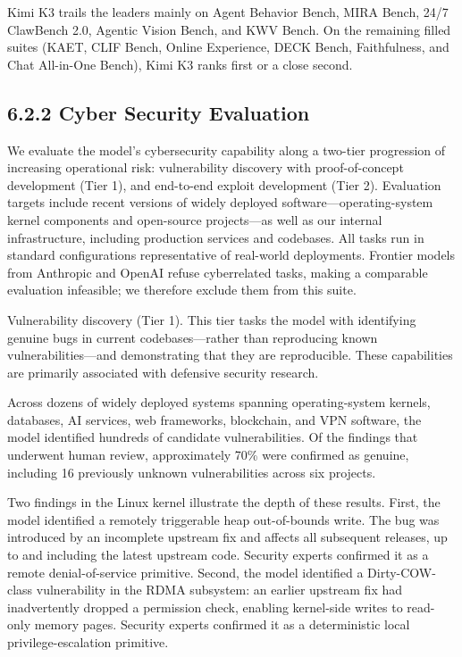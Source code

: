 \documentclass[
  10
]{article}
\begin{document}
Kimi K3 trails the leaders mainly on Agent Behavior Bench, MIRA Bench,
24/7 ClawBench 2.0, Agentic Vision Bench, and KWV Bench. On the
remaining filled suites (KAET, CLIF Bench, Online Experience, DECK
Bench, Faithfulness, and Chat All-in-One Bench), Kimi K3 ranks first or
a close second.

\subsection{6.2.2 Cyber Security
Evaluation}\label{cyber-security-evaluation}

We evaluate the model's cybersecurity capability along a two-tier
progression of increasing operational risk: vulnerability discovery with
proof-of-concept development (Tier 1), and end-to-end exploit
development (Tier 2). Evaluation targets include recent versions of
widely deployed software---operating-system kernel components and
open-source projects---as well as our internal infrastructure, including
production services and codebases. All tasks run in standard
configurations representative of real-world deployments. Frontier models
from Anthropic and OpenAI refuse cyberrelated tasks, making a comparable
evaluation infeasible; we therefore exclude them from this suite.

Vulnerability discovery (Tier 1). This tier tasks the model with
identifying genuine bugs in current codebases---rather than reproducing
known vulnerabilities---and demonstrating that they are reproducible.
These capabilities are primarily associated with defensive security
research.

Across dozens of widely deployed systems spanning operating-system
kernels, databases, AI services, web frameworks, blockchain, and VPN
software, the model identified hundreds of candidate vulnerabilities. Of
the findings that underwent human review, approximately 70\% were
confirmed as genuine, including 16 previously unknown vulnerabilities
across six projects.

Two findings in the Linux kernel illustrate the depth of these results.
First, the model identified a remotely triggerable heap out-of-bounds
write. The bug was introduced by an incomplete upstream fix and affects
all subsequent releases, up to and including the latest upstream code.
Security experts confirmed it as a remote denial-of-service primitive.
Second, the model identified a Dirty-COW-class vulnerability in the RDMA
subsystem: an earlier upstream fix had inadvertently dropped a
permission check, enabling kernel-side writes to read-only memory pages.
Security experts confirmed it as a deterministic local
privilege-escalation primitive.
\end{document}
